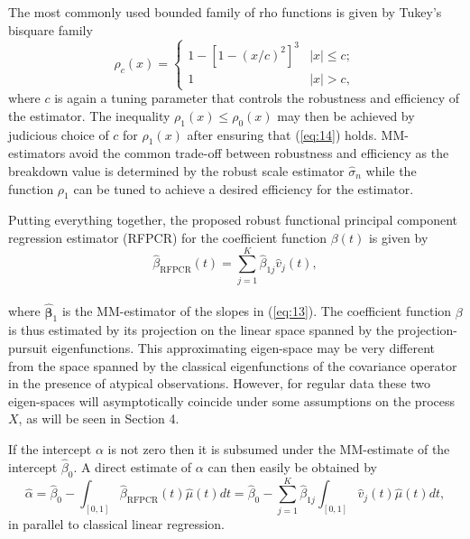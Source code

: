 \documentclass[11pt]{article}
\begin{document}
The most commonly used bounded family of rho functions is given by Tukey's bisquare family \citep{beaton1974fitting}
\begin{equation}
\label{eq:16}
\rho_c(x) = \begin{cases} 1-\left[1-(x/c)^2 \right]^3  & |x| \leq c; 
\\ 1 & |x| > c, \end{cases}
\end{equation}
where $c$ is again a tuning parameter that controls the robustness and efficiency of the estimator. The inequality $\rho_{1}(x) \leq \rho_{0}(x)$ may then be achieved by judicious choice of $c$ for $\rho_{1}(x)$ after ensuring that (\ref{eq:14}) holds. MM-estimators avoid the common trade-off between robustness and efficiency as the breakdown value is determined by the robust scale estimator $\widehat{\sigma}_n$ while the function $\rho_1$ can be tuned to achieve a desired efficiency for the estimator.

Putting everything together, the proposed robust functional principal component regression estimator (RFPCR) for the coefficient function $\beta(t)$ is given by
\begin{equation}
\label{eq:17}
\widehat{\beta}_{{\scriptscriptstyle \text{RFPCR}}}(t)  = \sum_{j=1}^K \widehat{\beta}_{1j} \widehat{v}_j (t),
\end{equation} \\
where $\widehat{\boldsymbol{\beta}}_1$ is the MM-estimator of the slopes in (\ref{eq:13}). The coefficient function $\beta$ is thus estimated by its projection on the linear space spanned by the projection-pursuit eigenfunctions.  This approximating eigen-space may be very different from the space spanned by the classical eigenfunctions of the covariance operator in the presence of atypical observations. However, for regular data these two eigen-spaces will asymptotically coincide under some assumptions on the process $X$, as will be seen in Section 4.

If the intercept $\alpha$ is not zero then it is subsumed under the MM-estimate of the intercept $\widehat{\beta}_0$. A direct estimate of $\alpha$ can then easily be obtained by  
\begin{equation}
\label{eq:18}
\widehat{\alpha} = \widehat{\beta}_0 - \int_{[0,1]} \widehat{\beta}_{{\scriptscriptstyle \text{RFPCR}}}(t) \widehat{\mu}(t) dt =  \widehat{\beta}_0 - \sum_{j=1}^K \widehat{\beta}_{1j} \int_{[0,1]} \widehat{v}_{j}(t) \widehat{\mu}(t) dt,
\end{equation}
in parallel to classical linear regression.
\end{document}
